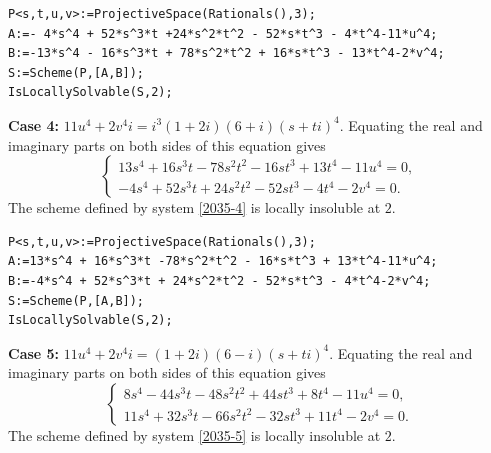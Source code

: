 \documentclass[a4paper,12pt,english,reqno]{amsart}
\begin{document}
\begin{lstlisting}
P<s,t,u,v>:=ProjectiveSpace(Rationals(),3);
A:=- 4*s^4 + 52*s^3*t +24*s^2*t^2 - 52*s*t^3 - 4*t^4-11*u^4;
B:=-13*s^4 - 16*s^3*t + 78*s^2*t^2 + 16*s*t^3 - 13*t^4-2*v^4;
S:=Scheme(P,[A,B]);
IsLocallySolvable(S,2);
\end{lstlisting}
{\bf Case 4:} $11u^4+2v^4i=i^3(1+2i)(6+i)(s+ti)^4$. Equating the real and imaginary parts on both sides of this equation gives
\begin{equation}\label{2035-4}
\begin{cases}
13s^4 + 16s^3t - 78s^2t^2 - 16st^3 + 13t^4 - 11u^4=0,\\
-4s^4 + 52s^3t + 24s^2t^2 - 52st^3 - 4t^4 - 2v^4=0.
\end{cases}
\end{equation}
The scheme defined by system \eqref{2035-4} is locally insoluble at $2$.


\begin{lstlisting}
P<s,t,u,v>:=ProjectiveSpace(Rationals(),3);
A:=13*s^4 + 16*s^3*t -78*s^2*t^2 - 16*s*t^3 + 13*t^4-11*u^4;
B:=-4*s^4 + 52*s^3*t + 24*s^2*t^2 - 52*s*t^3 - 4*t^4-2*v^4;
S:=Scheme(P,[A,B]);
IsLocallySolvable(S,2);
\end{lstlisting}

{\bf Case 5:} $11u^4+2v^4i=(1+2i)(6-i)(s+ti)^4$. Equating the real and imaginary parts on both sides of this equation gives
\begin{equation}\label{2035-5}
\begin{cases}
8s^4 - 44s^3t - 48s^2t^2 + 44st^3 + 8t^4 - 11u^4=0,\\
11s^4 + 32s^3t - 66s^2t^2 - 32st^3 + 11t^4 - 2v^4=0.
\end{cases}
\end{equation}
The scheme defined by system \eqref{2035-5} is locally insoluble at $2$.

\end{document}
